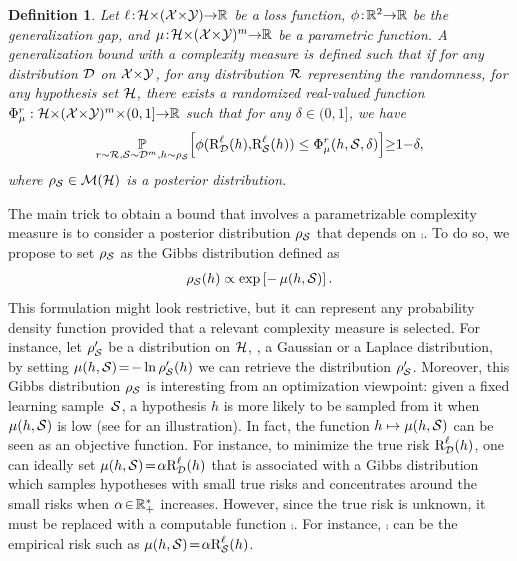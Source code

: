 \documentclass[twoside]{article}
\theoremstyle{plain}
\newtheorem{definition}[theorem]{Definition}
\begin{document}
\begin{definition}
\label{def:comp-bound}
Let $\ell\!:\! \mathcal{H}{\times}(\mathcal{X}{\times}\mathcal{Y}){\to}\mathbb{R}$ be a loss function, $\phi\!:\! \mathbb{R}^2{\to}\mathbb{R}$ be the generalization gap, and $\operatorname{\mu}\!:\! \mathcal{H}{\times}(\mathcal{X}{\times}\mathcal{Y})^m {\to} \mathbb{R}$ be a parametric function.
A generalization bound with a complexity measure is defined such that if for any distribution $\mathcal{D}$ on $\mathcal{X}{\times}\mathcal{Y}$, for any distribution $\mathcal{R}$ representing the randomness, for any hypothesis set $\mathcal{H}$, there exists a randomized real-valued function $\Phi_{\operatorname{\mu}}^{r}: \mathcal{H}{\times}(\mathcal{X}{\times}\mathcal{Y})^m{\times} (0,1] {\to} \mathbb{R}$ such that for any  $\delta\!\in\!(0, 1]$, we have
\begin{align*}
    \operatorname*{\mathbb{P}}_{r\sim\mathcal{R},\mathcal{S}\sim\mathcal{D}^m,h\sim\rho_{\mathcal{S}}}\!\Big[ \phi(\text{R}^{\ell}_{\mathcal{D}}(h){,}\text{R}^{\ell}_{\mathcal{S}}(h)) \le \Phi_{\operatorname{\mu}}^{r}(h, \mathcal{S}, \delta) \Big]{\ge}1{-}\delta,
\end{align*}
where $\rho_{\mathcal{S}}\in\mathcal{M}(\mathcal{H})$ is a posterior distribution. 
\end{definition}
The main trick to obtain a bound that involves a parametrizable complexity measure is to consider a posterior distribution $\rho_{\mathcal{S}}$ that depends on $\comp$.
To do so, we propose to set $\rho_{\mathcal{S}}$ as the Gibbs distribution defined as
\begin{align}
\label{eq:gibbs-distribution}
   \rho_{\mathcal{S}}(h) \propto \exp\left[-\operatorname{\mu}(h, \mathcal{S})\right].
\end{align}
This formulation might look restrictive, but it can represent any probability density function provided that a relevant complexity measure is selected. 
For instance, let $\rho_{\mathcal{S}}'$ be a distribution on $\mathcal{H}$, \eg, a Gaussian or a Laplace distribution, by setting $\operatorname{\mu}(h, \mathcal{S}) \!=\! - \ln\rho_{\mathcal{S}}'(h)$ we can retrieve the distribution $\rho_{\mathcal{S}}'$.
Moreover, this Gibbs distribution $\rho_{\mathcal{S}}$ is interesting from an optimization viewpoint: given a fixed learning \mbox{sample $\mathcal{S}$}, a hypothesis $h$ is more likely to be sampled from it when $\operatorname{\mu}(h, \mathcal{S})$ is low (see  for an illustration).
In fact, the function $h\mapsto\operatorname{\mu}(h, \mathcal{S})$ can be seen as an objective function.
For instance, to minimize the true risk $\text{R}^{\ell}_{\mathcal{D}}(h)$, one can ideally set $\operatorname{\mu}(h,\mathcal{S}) \!=\! \alpha\text{R}^{\ell}_{\mathcal{D}}(h)$ that is associated with a Gibbs distribution which samples hypotheses with small true risks and concentrates around the small risks when $\alpha\!\in\!\mathbb{R}_{+}^{*}$ increases.
However, since the true risk is unknown, it must be replaced with a computable function $\comp$.
For instance, $\comp$ can be the empirical risk such as $\operatorname{\mu}(h,\mathcal{S}) \!=\! \alpha\text{R}^{\ell}_{\mathcal{S}}(h)$.  
\end{document}
